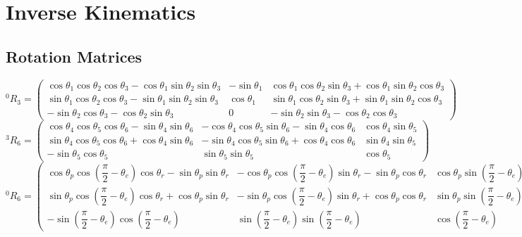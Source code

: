 \documentclass{article}
\begin{document}
\section{Inverse Kinematics}

\subsection{Rotation Matrices}
\bigskip
$
^{0}R_{3} = 
\begin{pmatrix}
	\cos\theta_{1} \cos\theta_{2} \cos\theta_{3} - \cos\theta_{1} \sin\theta_{2} \sin\theta_{3}
	& -\sin\theta_{1} &
	\cos\theta_{1} \cos\theta_{2} \sin\theta_{3} + \cos\theta_{1} \sin\theta_{2} \cos\theta_{3} \\
	\sin\theta_{1} \cos\theta_{2} \cos\theta_{3} - \sin\theta_{1} \sin\theta_{2} \sin\theta_{3}
	& \cos\theta_{1} &
	\sin\theta_{1} \cos\theta_{2} \sin\theta_{3} + \sin\theta_{1} \sin\theta_{2} \cos\theta_{3} \\
	- \sin\theta_{2} \cos\theta_{3} - \cos\theta_{2} \sin\theta_{3}
	& 0 &
	- \sin\theta_{2} \sin\theta_{3} - \cos\theta_{2} \cos\theta_{3}
\end{pmatrix}
$
\bigskip\\
$
^{3}R_{6} = 
\begin{pmatrix}
	\cos\theta_{4} \cos\theta_{5} \cos\theta_{6} - \sin\theta_{4} \sin\theta_{6} &
	- \cos\theta_{4} \cos\theta_{5} \sin\theta_{6} - \sin\theta_{4} \cos\theta_{6} &
	\cos\theta_{4} \sin\theta_{5} \\
	
	\sin\theta_{4} \cos\theta_{5} \cos\theta_{6} + \cos\theta_{4} \sin\theta_{6} &
	- \sin\theta_{4} \cos\theta_{5} \sin\theta_{6} + \cos\theta_{4} \cos\theta_{6} &
	\sin\theta_{4} \sin\theta_{5} \\
	
	- \sin\theta_{5} \cos\theta_{5} &
	\sin\theta_{5} \sin\theta_{5} &
	\cos\theta_{5}
\end{pmatrix}
$
\bigskip\\
$
^{0}R_{6} = 
\begin{pmatrix}
	\cos\theta_{p} \cos(\dfrac{\pi}{2} - \theta_{e}) \cos\theta_{r} - \sin\theta_{p} \sin\theta_{r} &
	- \cos\theta_{p} \cos(\dfrac{\pi}{2} - \theta_{e}) \sin\theta_{r} - \sin\theta_{p} \cos\theta_{r} &
	\cos\theta_{p} \sin(\dfrac{\pi}{2} - \theta_{e}) \\
	
	\sin\theta_{p} \cos(\dfrac{\pi}{2} - \theta_{e}) \cos\theta_{r} + \cos\theta_{p} \sin\theta_{r} &
	- \sin\theta_{p} \cos(\dfrac{\pi}{2} - \theta_{e}) \sin\theta_{r} + \cos\theta_{p} \cos\theta_{r} &
	\sin\theta_{p} \sin(\dfrac{\pi}{2} - \theta_{e}) \\
	
	- \sin(\dfrac{\pi}{2} - \theta_{e}) \cos(\dfrac{\pi}{2} - \theta_{e}) &
	\sin(\dfrac{\pi}{2} - \theta_{e}) \sin(\dfrac{\pi}{2} - \theta_{e}) &
	\cos(\dfrac{\pi}{2} - \theta_{e})
\end{pmatrix}
$
\end{document}
